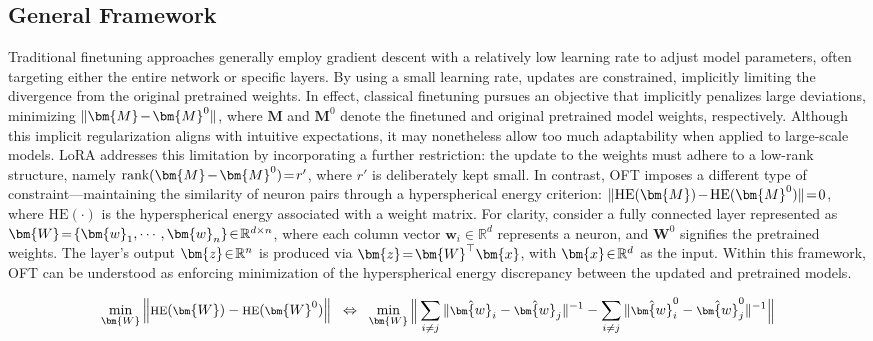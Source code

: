 \subsection{General Framework}

Traditional finetuning approaches generally employ gradient descent with a relatively low learning rate to adjust model parameters, often targeting either the entire network or specific layers. By using a small learning rate, updates are constrained, implicitly limiting the divergence from the original pretrained weights. In effect, classical finetuning pursues an objective that implicitly penalizes large deviations, minimizing $\thickmuskip=2mu \medmuskip=2mu \| \bm{M} - \bm{M}^0\|$, where $\bm{M}$ and $\bm{M}^0$ denote the finetuned and original pretrained model weights, respectively. Although this implicit regularization aligns with intuitive expectations, it may nonetheless allow too much adaptability when applied to large-scale models. LoRA addresses this limitation by incorporating a further restriction: the update to the weights must adhere to a low-rank structure, namely $\thickmuskip=2mu \medmuskip=2mu \text{rank}(\bm{M} - \bm{M}^0)=r'$, where $r'$ is deliberately kept small. In contrast, OFT imposes a different type of constraint—maintaining the similarity of neuron pairs through a hyperspherical energy criterion: $\thickmuskip=2mu \medmuskip=2mu \| \text{HE}(\bm{M})-\text{HE}(\bm{M}^0) \|=0$, where $\text{HE}(\cdot)$ is the hyperspherical energy associated with a weight matrix. For clarity, consider a fully connected layer represented as $\thickmuskip=2mu \medmuskip=2mu \bm{W}=\{\bm{w}_1,\cdots,\bm{w}_n\}\in\mathbb{R}^{d\times n}$, where each column vector $\bm{w}_i\in\mathbb{R}^{d}$ represents a neuron, and $\bm{W}^0$ signifies the pretrained weights. The layer's output $\thickmuskip=2mu \medmuskip=2mu \bm{z}\in\mathbb{R}^n$ is produced via $\thickmuskip=2mu \medmuskip=2mu \bm{z}=\bm{W}^\top\bm{x}$, with $\thickmuskip=2mu \medmuskip=2mu \bm{x}\in\mathbb{R}^d$ as the input. Within this framework, OFT can be understood as enforcing minimization of the hyperspherical energy discrepancy between the updated and pretrained models.

\begin{equation}\label{eq:oft_principle}
\footnotesize
\min_{\bm{W}} \left\| \text{HE}(\bm{W})-\text{HE}(\bm{W}^0)\right\|~~\Leftrightarrow~~\min_{\bm{W}} \bigg{\|} \sum_{i\neq j} \|\hat{\bm{w}}_i-\hat{\bm{w}}_j\|^{-1}-\sum_{i\neq j} \|\hat{\bm{w}}^0_i-\hat{\bm{w}}^0_j\|^{-1}\bigg{\|}
\end{equation}

